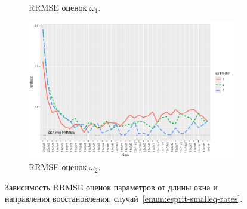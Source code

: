 \documentclass[specialist,
  substylefile=spbu.rtx,
subf,href,colorlinks=true, 12pt]{disser}
\theoremstyle{plain}
\theoremstyle{definition}
\theoremstyle{remark}
\begin{document}
\begin{figure}[!ht]
\begin{subfigure}{0.49\linewidth}
    \caption{RRMSE оценок $\omega_1$.}
    \label{fig:freq1_dims_small_eq_rates}
  \end{subfigure}
  \begin{subfigure}{0.49\linewidth}
    \includegraphics[width=\linewidth]{freq2_dims_small_eq_rates.pdf}
    \caption{RRMSE оценок $\omega_2$.}
    \label{fig:freq2_dims_small_eq_rates}
  \end{subfigure}
  \caption{Зависимость RRMSE оценок параметров от длины окна и направления восстановления,
  случай~\ref{enum:esprit-smalleq-rates}.}
  \label{fig:dims_small_eq_rates}
\end{figure}
\end{document}
